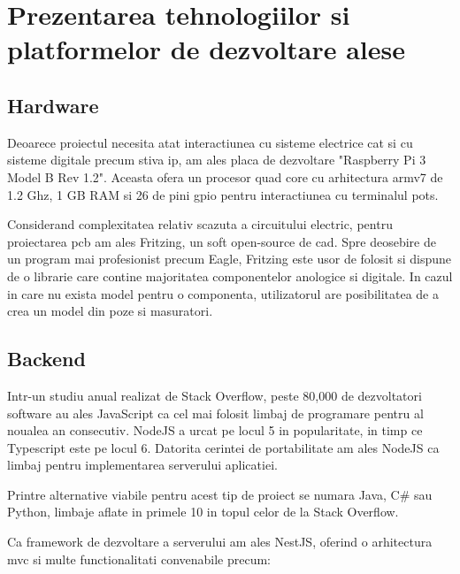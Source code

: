 \section {Prezentarea tehnologiilor si platformelor de dezvoltare alese}

\subsection {Hardware}

Deoarece proiectul necesita atat interactiunea cu sisteme electrice cat si cu sisteme digitale precum stiva \acrshort{ip}, am ales placa de dezvoltare "Raspberry Pi 3 Model B Rev 1.2". Aceasta ofera un procesor quad core cu arhitectura armv7 de 1.2 Ghz, 1 GB RAM si 26 de pini \acrfull{gpio} pentru interactiunea cu terminalul \acrshort{pots}.

Considerand complexitatea relativ scazuta a circuitului electric, pentru proiectarea \acrshort{pcb} am ales Fritzing, un soft open-source de \acrfull{cad}. Spre deosebire de un program mai profesionist precum Eagle, Fritzing este usor de folosit si dispune de o librarie care contine majoritatea componentelor anologice si digitale. In cazul in care nu exista model pentru o componenta, utilizatorul are posibilitatea de a crea un model din poze si masuratori. 

\subsection {Backend}

Intr-un studiu anual realizat de Stack Overflow, peste 80,000 de dezvoltatori software au ales JavaScript ca cel mai folosit limbaj de programare pentru al noualea an consecutiv. NodeJS a urcat pe locul 5 in popularitate, in timp ce Typescript este pe locul 6. Datorita cerintei de portabilitate am ales NodeJS ca limbaj pentru implementarea serverului aplicatiei. \cite{StackOverflow2021Survey}

Printre alternative viabile pentru acest tip de proiect se numara Java, C\# sau Python, limbaje aflate in primele 10 in topul celor de la Stack Overflow.

Ca framework de dezvoltare a serverului am ales NestJS, oferind o arhitectura \acrfull{mvc} si multe functionalitati convenabile precum:

